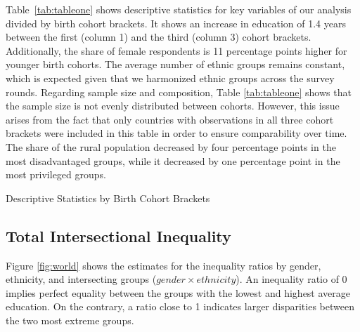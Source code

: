 Table~\ref{tab:tableone} shows descriptive statistics for key variables of our analysis divided by birth cohort brackets. It shows an increase in education of 1.4 years between the first (column 1) and the third (column 3) cohort brackets. Additionally, the share of female respondents is 11 percentage points higher for younger birth cohorts. The average number of ethnic groups remains constant, which is expected given that we harmonized ethnic groups across the survey rounds. Regarding sample size and composition, Table \ref{tab:tableone} shows that the sample size is not evenly distributed between cohorts. However, this issue arises from the fact that only countries with observations in all three cohort brackets were included in this table in order to ensure comparability over time. The share of the rural population decreased by four percentage points in the most disadvantaged groups, while it decreased by one percentage point in the most privileged groups.

\begin{table}[htb]
\caption{\label{tab:tableone}Descriptive Statistics by Birth Cohort Brackets}
\centering

\end{table}

\hypertarget{intersectional-inequality}{%
\subsection{Total Intersectional Inequality}\label{intersectional-inequality}}

Figure \ref{fig:world} shows the estimates for the inequality ratios by gender, ethnicity, and intersecting groups ($gender \times ethnicity$). An inequality ratio of 0 implies perfect equality between the groups with the lowest and highest average education. On the contrary, a ratio close to 1 indicates larger disparities between the two most extreme groups.

